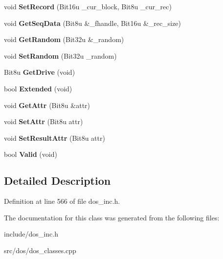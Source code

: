 \begin{DoxyCompactItemize}
\item 
\hypertarget{classDOS__FCB_aa4f8785c2b5e67e613e38a2663cc08b2}{void {\bfseries Set\-Record} (Bit16u \-\_\-cur\-\_\-block, Bit8u \-\_\-cur\-\_\-rec)}\label{classDOS__FCB_aa4f8785c2b5e67e613e38a2663cc08b2}

\item 
\hypertarget{classDOS__FCB_a2e9b07c8a0a281e21f6151e4766cd741}{void {\bfseries Get\-Seq\-Data} (Bit8u \&\-\_\-fhandle, Bit16u \&\-\_\-rec\-\_\-size)}\label{classDOS__FCB_a2e9b07c8a0a281e21f6151e4766cd741}

\item 
\hypertarget{classDOS__FCB_ab49248721f42da4974744a8810027230}{void {\bfseries Get\-Random} (Bit32u \&\-\_\-random)}\label{classDOS__FCB_ab49248721f42da4974744a8810027230}

\item 
\hypertarget{classDOS__FCB_aa6d6128bfcca69f73790e0e07be677da}{void {\bfseries Set\-Random} (Bit32u \-\_\-random)}\label{classDOS__FCB_aa6d6128bfcca69f73790e0e07be677da}

\item 
\hypertarget{classDOS__FCB_a6da07c697a956f04f9df2fa0cb9249ab}{Bit8u {\bfseries Get\-Drive} (void)}\label{classDOS__FCB_a6da07c697a956f04f9df2fa0cb9249ab}

\item 
\hypertarget{classDOS__FCB_ad4a466929e2135cbbf36cce3f93c1009}{bool {\bfseries Extended} (void)}\label{classDOS__FCB_ad4a466929e2135cbbf36cce3f93c1009}

\item 
\hypertarget{classDOS__FCB_aead0618722ff1f674547679cd38451ad}{void {\bfseries Get\-Attr} (Bit8u \&attr)}\label{classDOS__FCB_aead0618722ff1f674547679cd38451ad}

\item 
\hypertarget{classDOS__FCB_ac0a82ec6f3d72a69d54579fa640c5669}{void {\bfseries Set\-Attr} (Bit8u attr)}\label{classDOS__FCB_ac0a82ec6f3d72a69d54579fa640c5669}

\item 
\hypertarget{classDOS__FCB_a75db597566f524cb0de9dfc2be6a8c7f}{void {\bfseries Set\-Result\-Attr} (Bit8u attr)}\label{classDOS__FCB_a75db597566f524cb0de9dfc2be6a8c7f}

\item 
\hypertarget{classDOS__FCB_ab247afb9301a93fb192cd8d60acf6219}{bool {\bfseries Valid} (void)}\label{classDOS__FCB_ab247afb9301a93fb192cd8d60acf6219}

\end{DoxyCompactItemize}


\subsection{Detailed Description}


Definition at line 566 of file dos\-\_\-inc.\-h.



The documentation for this class was generated from the following files\-:\begin{DoxyCompactItemize}
\item 
include/dos\-\_\-inc.\-h\item 
src/dos/dos\-\_\-classes.\-cpp\end{DoxyCompactItemize}
